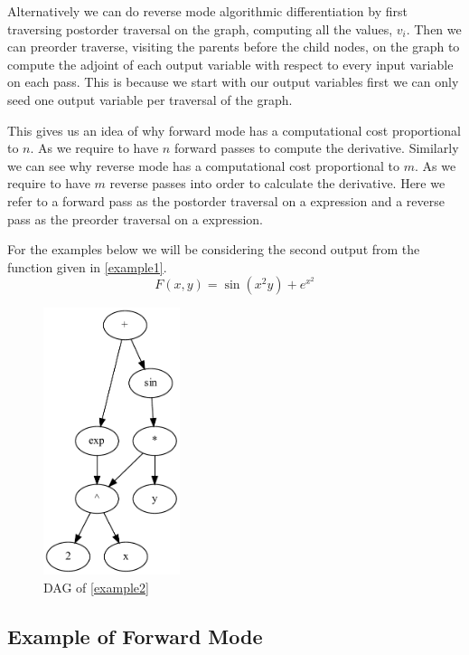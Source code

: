 \documentclass{article}
\begin{document}
Alternatively we can do reverse mode algorithmic differentiation by first traversing postorder traversal on the graph, computing all the values, $v_i$. Then we can preorder traverse, visiting the parents before the child nodes, on the graph to compute the adjoint of each output variable with respect to every input variable on each pass. This is because we start with our output variables first we can only seed one output variable per traversal of the graph.

This gives us an idea of why forward mode has a computational cost proportional to $n$. As we require to have $n$ forward passes to compute the derivative. Similarly we can see why reverse mode has a computational cost proportional to $m$. As we require to have $m$ reverse passes into order to calculate the derivative. Here we refer to a forward pass as the postorder traversal on a expression and a reverse pass as the preorder traversal on a expression.

For the examples below we will be considering the second output from the function given in \eqref{example1}.
\begin{equation}
    \label{example2}
    F(x,y) = \sin(x^2y) + e^{x^2}
\end{equation}


\begin{figure}[h!]
    \includegraphics[width=4cm]{images/Graph_Example2.pdf}
    \caption{DAG of \eqref{example2}}
    \label{fig:DAGgraph}
\end{figure}

\subsection{Example of Forward Mode}
\end{document}
